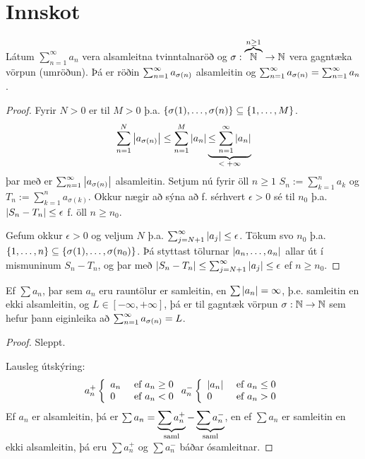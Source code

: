 \documentclass[12pt]{book}
\begin{document}
\section*{Innskot}

\begin{setn}
Látum $\sum_{n=1}^{\infty}a_n$ vera alsamleitna tvinntalnaröð og $\sigma: \overbrace{\mathbb{N}}^{n \geq 1} \to \mathbb{N}$ vera gagntæka vörpun (umröðun). Þá er röðin $\sum_{n = {1}}^{\infty} a_{\sigma(n)}$ alsamleitin og $\sum_{n = {1}}^{\infty} a_{\sigma(n)} = \sum_{n = 1}^{\infty} a_n$.
\end{setn}
\begin{proof}
Fyrir $N > 0$ er til $M > 0$ þ.a. $\{\sigma(1), \dotsc, \sigma(n)\} \subseteq \{1, \dotsc, M\}$.
\[\sum_{n=1}^{N}  \left|a_{\sigma(n)}\right|
\leq \sum_{n = 1}^M \left|a_n\right|
\underbrace{\leq \sum_{n = {1}}^{\infty} \left|a_n\right|}_{\text{$< +\infty$}}
\]
þar með er $\sum_{n = 1}^{\infty} \left|a_{\sigma(n)}\right|$ alsamleitin.
Setjum nú fyrir öll $n \geq 1$ $S_n := \sum_{k=1}^n a_k$ og $T_n := \sum_{k=1}^n a_{\sigma(k)}$.
Okkur nægir að sýna að f. sérhvert $\epsilon > 0$ sé til $n_0$ þ.a. $\left|S_n - T_n\right| \leq \epsilon$ f. öll $n \geq n_0$.

Gefum okkur $\epsilon > 0$ og veljum $N$ þ.a. $\sum_{j = N+1}^{\infty} \left|a_j\right| \leq \epsilon$. Tökum svo $n_0$ þ.a. $ \{1, \dotsc, n\} \subseteq \{\sigma(1), \dotsc, \sigma(n_0)\}$. Þá styttast tölurnar $\left|a_n, \dotsc, a_n\right|$ allar út í mismuninum $S_n - T_n$, og þar með $\left|S_n - T_n\right| \leq \sum_{j = N+1}^{\infty} \left|a_j\right|  \leq \epsilon$ ef $n \geq n_0$.
\end{proof}

\begin{setn}
Ef $\sum a_n$, þar sem $a_n$ eru rauntölur er samleitin, en $\sum \left|a_n\right| = \infty$, þ.e.
samleitin en ekki alsamleitin, og $L \in [-\infty, +\infty]$, þá er til gagntæk vörpun
$\sigma: \mathbb{N} \to \mathbb{N}$ sem hefur þann eiginleika að $\sum_{n = 1}^{\infty} a_{\sigma(n)} = L$.
\end{setn}
\begin{proof} Sleppt.

Lausleg útskýring:
\[a_n^+ \left\{ \begin{array}{l l} a_n & \text{ ef } a_n \geq 0 \\ 0 & \text{ ef } a_n < 0 \end{array} \right. 
a_n^- \left\{ \begin{array}{l l} \left|a_n\right| & \text{ ef } a_n \leq 0 \\ 0 & \text{ ef } a_n > 0 \end{array} \right.
\]
Ef $a_n$ er alsamleitin, þá er $\sum a_n = \underbrace{\sum a_n^+}_{\text{saml}} - \underbrace{\sum a_n^-}_{\text{saml}}$,
en ef $\sum a_n$ er samleitin en ekki alsamleitin, þá eru $\sum a_n^+$ og $\sum a_n^-$ báðar ósamleitnar.

\end{proof}
\end{document}
